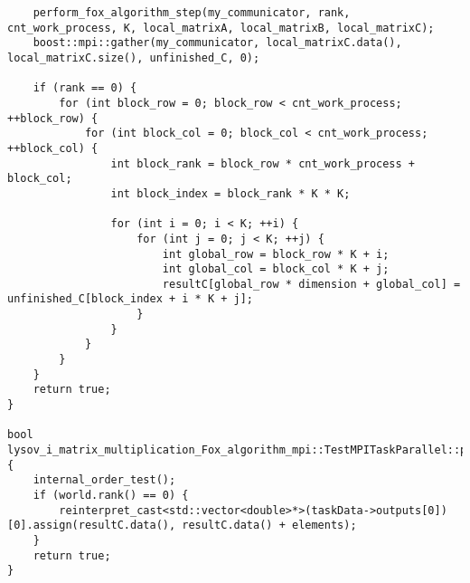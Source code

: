 \documentclass{report}
\begin{document}
\begin{lstlisting}
	perform_fox_algorithm_step(my_communicator, rank, cnt_work_process, K, local_matrixA, local_matrixB, local_matrixC);
	boost::mpi::gather(my_communicator, local_matrixC.data(), local_matrixC.size(), unfinished_C, 0);
	
	if (rank == 0) {
		for (int block_row = 0; block_row < cnt_work_process; ++block_row) {
			for (int block_col = 0; block_col < cnt_work_process; ++block_col) {
				int block_rank = block_row * cnt_work_process + block_col;
				int block_index = block_rank * K * K;
				
				for (int i = 0; i < K; ++i) {
					for (int j = 0; j < K; ++j) {
						int global_row = block_row * K + i;
						int global_col = block_col * K + j;
						resultC[global_row * dimension + global_col] = unfinished_C[block_index + i * K + j];
					}
				}
			}
		}
	}
	return true;
}

bool lysov_i_matrix_multiplication_Fox_algorithm_mpi::TestMPITaskParallel::post_processing() {
	internal_order_test();
	if (world.rank() == 0) {
		reinterpret_cast<std::vector<double>*>(taskData->outputs[0])[0].assign(resultC.data(), resultC.data() + elements);
	}
	return true;
}
\end{lstlisting}
\end{document}
